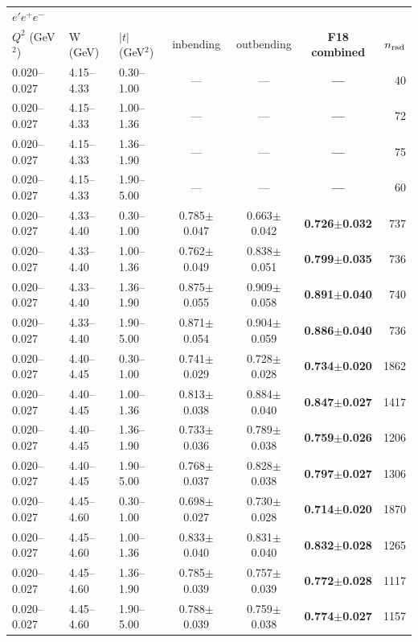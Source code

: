 \begin{tabular}{lllcccr}\toprule
\multicolumn{7}{l}{$e'e^+e^-$}\\
$Q^2$ (GeV$^2$) & W (GeV) & $|t|$ (GeV$^2$) & inbending & outbending & \textbf{F18 combined} & $n_{\rm rad}$ \\\midrule
0.020--0.027 & 4.15--4.33 & 0.30--1.00 & --- & --- & \textbf{---} & 40 \\
0.020--0.027 & 4.15--4.33 & 1.00--1.36 & --- & --- & \textbf{---} & 72 \\
0.020--0.027 & 4.15--4.33 & 1.36--1.90 & --- & --- & \textbf{---} & 75 \\
0.020--0.027 & 4.15--4.33 & 1.90--5.00 & --- & --- & \textbf{---} & 60 \\
0.020--0.027 & 4.33--4.40 & 0.30--1.00 & 0.785$\pm$0.047 & 0.663$\pm$0.042 & \textbf{0.726$\pm$0.032} & 737 \\
0.020--0.027 & 4.33--4.40 & 1.00--1.36 & 0.762$\pm$0.049 & 0.838$\pm$0.051 & \textbf{0.799$\pm$0.035} & 736 \\
0.020--0.027 & 4.33--4.40 & 1.36--1.90 & 0.875$\pm$0.055 & 0.909$\pm$0.058 & \textbf{0.891$\pm$0.040} & 740 \\
0.020--0.027 & 4.33--4.40 & 1.90--5.00 & 0.871$\pm$0.054 & 0.904$\pm$0.059 & \textbf{0.886$\pm$0.040} & 736 \\
0.020--0.027 & 4.40--4.45 & 0.30--1.00 & 0.741$\pm$0.029 & 0.728$\pm$0.028 & \textbf{0.734$\pm$0.020} & 1862 \\
0.020--0.027 & 4.40--4.45 & 1.00--1.36 & 0.813$\pm$0.038 & 0.884$\pm$0.040 & \textbf{0.847$\pm$0.027} & 1417 \\
0.020--0.027 & 4.40--4.45 & 1.36--1.90 & 0.733$\pm$0.036 & 0.789$\pm$0.038 & \textbf{0.759$\pm$0.026} & 1206 \\
0.020--0.027 & 4.40--4.45 & 1.90--5.00 & 0.768$\pm$0.037 & 0.828$\pm$0.038 & \textbf{0.797$\pm$0.027} & 1306 \\
0.020--0.027 & 4.45--4.60 & 0.30--1.00 & 0.698$\pm$0.027 & 0.730$\pm$0.028 & \textbf{0.714$\pm$0.020} & 1870 \\
0.020--0.027 & 4.45--4.60 & 1.00--1.36 & 0.833$\pm$0.040 & 0.831$\pm$0.040 & \textbf{0.832$\pm$0.028} & 1265 \\
0.020--0.027 & 4.45--4.60 & 1.36--1.90 & 0.785$\pm$0.039 & 0.757$\pm$0.039 & \textbf{0.772$\pm$0.028} & 1117 \\
0.020--0.027 & 4.45--4.60 & 1.90--5.00 & 0.788$\pm$0.039 & 0.759$\pm$0.038 & \textbf{0.774$\pm$0.027} & 1157 \\
\bottomrule\end{tabular}

